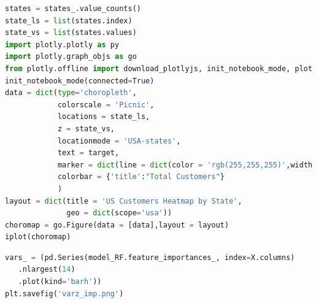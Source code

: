 \documentclass[a4paper,12pt]{report}
\begin{document}
\begin{lstlisting}[language=Python, caption=US Heatmap,label=lst:B.6]
states = states_.value_counts()
state_ls = list(states.index)
state_vs = list(states.values)
import plotly.plotly as py
import plotly.graph_objs as go 
from plotly.offline import download_plotlyjs, init_notebook_mode, plot, iplot
init_notebook_mode(connected=True) 
data = dict(type='choropleth',
            colorscale = 'Picnic',
            locations = state_ls,
            z = state_vs,
            locationmode = 'USA-states',
            text = target,
            marker = dict(line = dict(color = 'rgb(255,255,255)',width = 2)),
            colorbar = {'title':"Total Customers"}
            )
layout = dict(title = 'US Customers Heatmap by State',
              geo = dict(scope='usa'))
choromap = go.Figure(data = [data],layout = layout)
iplot(choromap)
\end{lstlisting} 
\FloatBarrier
\begin{lstlisting}[language=Python, caption=Variable Importance,label=lst:B.7]
vars_ = (pd.Series(model_RF.feature_importances_, index=X.columns)
   .nlargest(14)
   .plot(kind='barh'))
plt.savefig('varz_imp.png')
\end{lstlisting} 
\end{document}
